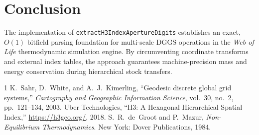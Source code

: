 \documentclass[10pt,journal,compsoc]{IEEEtran}
\begin{document}
\section{Conclusion}
The implementation of \texttt{extractH3IndexApertureDigits} establishes an exact, $O(1)$ bitfield parsing foundation for multi-scale DGGS operations in the \textit{Web of Life} thermodynamic simulation engine. By circumventing coordinate transforms and external index tables, the approach guarantees machine-precision mass and energy conservation during hierarchical stock transfers.


\begin{thebibliography}{1}
K.~Sahr, D.~White, and A.~J.~Kimerling, ``Geodesic discrete global grid systems,'' \emph{Cartography and Geographic Information Science}, vol.~30, no.~2, pp.~121--134, 2003.
Uber Technologies, ``H3: A Hexagonal Hierarchical Spatial Index,'' \url{https://h3geo.org/}, 2018.
S.~R.~de~Groot and P.~Mazur, \emph{Non-Equilibrium Thermodynamics}. New York: Dover Publications, 1984.
\end{thebibliography}
\end{document}
